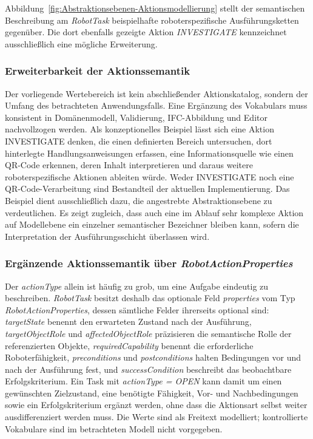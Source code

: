 Abbildung~\ref{fig:Abstraktionsebenen-Aktionsmodellierung} stellt der semantischen Beschreibung am
\textit{RobotTask} beispielhafte roboterspezifische Ausführungsketten gegenüber. Die dort ebenfalls
gezeigte Aktion \textit{INVESTIGATE} kennzeichnet ausschließlich eine mögliche Erweiterung.


\subsubsection{Erweiterbarkeit der Aktionssemantik}
Der vorliegende Wertebereich ist kein abschließender Aktionskatalog, sondern der Umfang des
betrachteten Anwendungsfalls. Eine Ergänzung des Vokabulars muss konsistent in Domänenmodell,
Validierung, IFC-Abbildung und Editor nachvollzogen werden. Als konzeptionelles Beispiel
lässt sich eine Aktion INVESTIGATE denken, die einen definierten Bereich untersuchen, dort
hinterlegte Handlungsanweisungen erfassen, eine Informationsquelle wie einen QR-Code erkennen, deren
Inhalt interpretieren und daraus weitere roboterspezifische Aktionen ableiten würde. Weder
INVESTIGATE noch eine QR-Code-Verarbeitung sind Bestandteil der aktuellen Implementierung. Das
Beispiel dient ausschließlich dazu, die angestrebte Abstraktionsebene zu verdeutlichen. Es zeigt
zugleich, dass auch eine im Ablauf sehr komplexe Aktion auf Modellebene ein einzelner semantischer
Bezeichner bleiben kann, sofern die Interpretation der Ausführungsschicht überlassen wird.

\subsubsection{Ergänzende Aktionssemantik über \textit{RobotActionProperties}}
Der \textit{actionType} allein ist häufig zu grob, um eine Aufgabe eindeutig zu beschreiben. \textit{RobotTask}
besitzt deshalb das optionale Feld \textit{properties} vom Typ \textit{RobotActionProperties}, dessen sämtliche
Felder ihrerseits optional sind: \textit{targetState} benennt den erwarteten Zustand nach der Ausführung,
\textit{targetObjectRole} und \textit{affectedObjectRole} präzisieren die semantische Rolle der referenzierten
Objekte, \textit{requiredCapability} benennt die erforderliche Roboterfähigkeit, \textit{preconditions} und
\textit{postconditions} halten Bedingungen vor und nach der Ausführung fest, und \textit{successCondition}
beschreibt das beobachtbare Erfolgskriterium. Ein Task mit \textit{actionType = OPEN} kann damit um einen
gewünschten Zielzustand, eine benötigte Fähigkeit, Vor- und Nachbedingungen sowie ein
Erfolgskriterium ergänzt werden, ohne dass die Aktionsart selbst weiter ausdifferenziert werden
muss. Die Werte sind als Freitext modelliert; kontrollierte Vokabulare sind im betrachteten Modell
nicht vorgegeben.
